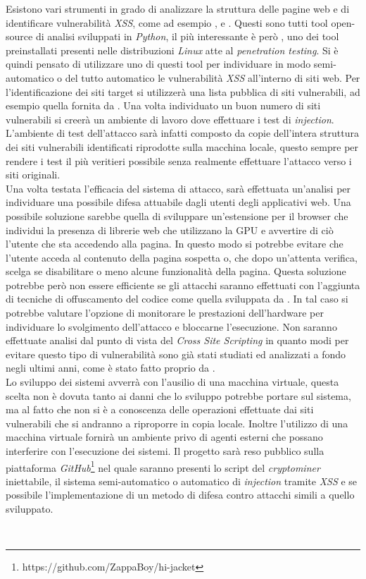 \documentclass[
11pt, %
oneside, %
italian, %
onehalfspacing,%
headsepline, %
]{MastersDoctoralThesis} %
\newcommand\citen[1]{\citeauthor{#1} \citep{#1}}
\newcommand\citetitlen[1]{\citetitle{#1} \citep{#1}}
\begin{document}
Esistono vari strumenti in grado di analizzare la struttura delle pagine web e di identificare vulnerabilità \emph{XSS}, come ad esempio \citetitlen{XSStrike}, \citetitlen{Traxss} e \citetitlen{XSSer}. Questi sono tutti tool open-source di analisi sviluppati in \emph{Python}, il più interessante è però , uno dei tool preinstallati presenti nelle distribuzioni \emph{Linux} atte al \emph{penetration testing}. Si è quindi pensato di utilizzare uno di questi tool per individuare in modo semi-automatico o del tutto automatico le vulnerabilità \emph{XSS} all'interno di siti web. Per l'identificazione dei siti target si utilizzerà una lista pubblica di siti vulnerabili, ad esempio quella fornita da \citen{xssed}. Una volta individuato un buon numero di siti vulnerabili si creerà un ambiente di lavoro dove effettuare i test di \emph{injection}. L'ambiente di test dell'attacco sarà infatti composto da copie dell'intera struttura dei siti vulnerabili identificati riprodotte sulla macchina locale, questo sempre per rendere i test il più veritieri possibile senza realmente effettuare l'attacco verso i siti originali.\\
Una volta testata l'efficacia del sistema di attacco, sarà effettuata un'analisi per individuare una possibile difesa attuabile dagli utenti degli applicativi web. Una possibile soluzione sarebbe quella di sviluppare un'estensione per il browser che individui la presenza di librerie web che utilizzano la GPU e avvertire di ciò l'utente che sta accedendo alla pagina. In questo modo si potrebbe evitare che l'utente acceda al contenuto della pagina sospetta o, che dopo un'attenta verifica, scelga se disabilitare o meno alcune funzionalità della pagina. Questa soluzione potrebbe però non essere efficiente se gli attacchi saranno effettuati con l'aggiunta di tecniche di offuscamento del codice come quella sviluppata da \citen{sharif2008impeding}. In tal caso si potrebbe valutare l'opzione di monitorare le prestazioni dell'hardware per individuare lo svolgimento dell'attacco e bloccarne l'esecuzione. Non saranno effettuate analisi dal punto di vista del \emph{Cross Site Scripting} in quanto modi per evitare questo tipo di vulnerabilità sono già stati studiati ed analizzati a fondo negli ultimi anni, come è stato fatto proprio da \citen{bisht2008xss}.\\
Lo sviluppo dei sistemi avverrà con l'ausilio di una macchina virtuale, questa scelta non è dovuta tanto ai danni che lo sviluppo potrebbe portare sul sistema, ma al fatto che non si è a conoscenza delle operazioni effettuate dai siti vulnerabili che si andranno a riproporre in copia locale. Inoltre l'utilizzo di una macchina virtuale fornirà un ambiente privo di agenti esterni che possano interferire con l'esecuzione dei sistemi. Il progetto sarà reso pubblico sulla piattaforma \emph{GitHub}\footnote{https://github.com/ZappaBoy/hi-jacket} nel quale saranno presenti lo script del \emph{cryptominer} iniettabile, il sistema semi-automatico o automatico di \emph{injection} tramite \emph{XSS} e se possibile l'implementazione di un metodo di difesa contro attacchi simili a quello sviluppato.


\printbibliography\
\end{document}
